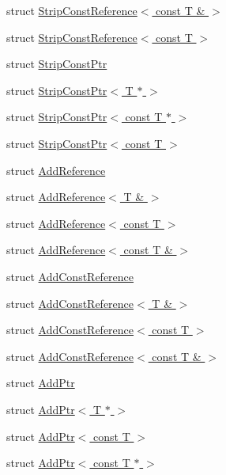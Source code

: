 \begin{DoxyCompactItemize}
\item 
struct \hyperlink{structmsf__tmp_1_1StripConstReference_3_01const_01T_01_6_01_4}{Strip\-Const\-Reference$<$ const T \& $>$}
\item 
struct \hyperlink{structmsf__tmp_1_1StripConstReference_3_01const_01T_01_4}{Strip\-Const\-Reference$<$ const T $>$}
\item 
struct \hyperlink{structmsf__tmp_1_1StripConstPtr}{Strip\-Const\-Ptr}
\item 
struct \hyperlink{structmsf__tmp_1_1StripConstPtr_3_01T_01_5_01_4}{Strip\-Const\-Ptr$<$ T $\ast$ $>$}
\item 
struct \hyperlink{structmsf__tmp_1_1StripConstPtr_3_01const_01T_01_5_01_4}{Strip\-Const\-Ptr$<$ const T $\ast$ $>$}
\item 
struct \hyperlink{structmsf__tmp_1_1StripConstPtr_3_01const_01T_01_4}{Strip\-Const\-Ptr$<$ const T $>$}
\item 
struct \hyperlink{structmsf__tmp_1_1AddReference}{Add\-Reference}
\item 
struct \hyperlink{structmsf__tmp_1_1AddReference_3_01T_01_6_01_4}{Add\-Reference$<$ T \& $>$}
\item 
struct \hyperlink{structmsf__tmp_1_1AddReference_3_01const_01T_01_4}{Add\-Reference$<$ const T $>$}
\item 
struct \hyperlink{structmsf__tmp_1_1AddReference_3_01const_01T_01_6_01_4}{Add\-Reference$<$ const T \& $>$}
\item 
struct \hyperlink{structmsf__tmp_1_1AddConstReference}{Add\-Const\-Reference}
\item 
struct \hyperlink{structmsf__tmp_1_1AddConstReference_3_01T_01_6_01_4}{Add\-Const\-Reference$<$ T \& $>$}
\item 
struct \hyperlink{structmsf__tmp_1_1AddConstReference_3_01const_01T_01_4}{Add\-Const\-Reference$<$ const T $>$}
\item 
struct \hyperlink{structmsf__tmp_1_1AddConstReference_3_01const_01T_01_6_01_4}{Add\-Const\-Reference$<$ const T \& $>$}
\item 
struct \hyperlink{structmsf__tmp_1_1AddPtr}{Add\-Ptr}
\item 
struct \hyperlink{structmsf__tmp_1_1AddPtr_3_01T_01_5_01_4}{Add\-Ptr$<$ T $\ast$ $>$}
\item 
struct \hyperlink{structmsf__tmp_1_1AddPtr_3_01const_01T_01_4}{Add\-Ptr$<$ const T $>$}
\item 
struct \hyperlink{structmsf__tmp_1_1AddPtr_3_01const_01T_01_5_01_4}{Add\-Ptr$<$ const T $\ast$ $>$}
\item 

\end{DoxyCompactItemize}
